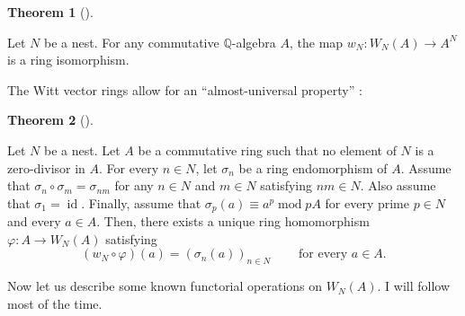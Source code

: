 \documentclass[numbers=enddot,12pt,final,onecolumn,notitlepage]{scrartcl}%
\theoremstyle{definition}
\newtheorem{theo}{Theorem}[section]
\newenvironment{theorem}[1][]
{\begin{theo}[#1]\begin{leftbar}}
{\end{leftbar}\end{theo}}
\begin{document}
\begin{theorem}
\label{thm.Witt.iso}Let $N$ be a nest. For any commutative $\mathbb{Q}%
$-algebra $A$, the map $w_{N}:W_{N}\left(  A\right)  \rightarrow A^{N}$ is a
ring isomorphism.
\end{theorem}

The Witt vector rings allow for an ``almost-universal property'' \cite[Theorem
6.1]{rabinoff-witt}:

\begin{theorem}
\label{thm.Witt.frob.au}Let $N$ be a nest. Let $A$ be a commutative ring such
that no element of $N$ is a zero-divisor in $A$. For every $n\in N$, let
$\sigma_{n}$ be a ring endomorphism of $A$. Assume that $\sigma_{n}\circ
\sigma_{m}=\sigma_{nm}$ for any $n\in N$ and $m\in N$ satisfying $nm\in N$.
Also assume that $\sigma_{1}=\operatorname*{id}$. Finally, assume that
$\sigma_{p}\left(  a\right)  \equiv a^{p}\operatorname{mod}pA$ for every prime
$p\in N$ and every $a\in A$. Then, there exists a unique ring homomorphism
$\varphi:A\rightarrow W_{N}\left(  A\right)  $ satisfying%
\[
\left(  w_{N}\circ\varphi\right)  \left(  a\right)  =\left(  \sigma_{n}\left(
a\right)  \right)  _{n\in N}\ \ \ \ \ \ \ \ \ \ \text{for every }a\in A.
\]

\end{theorem}

Now let us describe some known functorial operations on $W_{N}\left(
A\right)  $. I will follow \cite{rabinoff-witt} most of the time.
\end{document}
